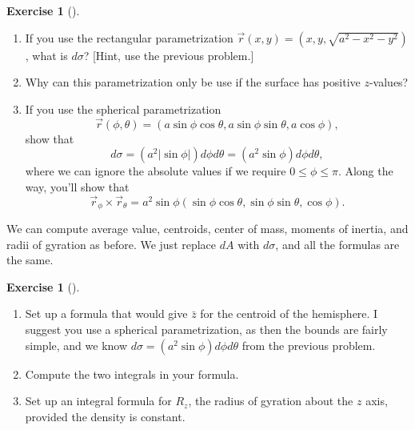 \documentclass[10pt,]{book}
\theoremstyle{plain}
\theoremstyle{definition}
\theoremstyle{definition}
\theoremstyle{definition}
\theoremstyle{definition}
\newtheorem{exploration}[project]{Exercise}
\theoremstyle{definition}
\numberwithin{equation}{section}
\begin{document}
\begin{exploration}[]\label{sphere_surface_area_element}
\leavevmode%
\begin{enumerate}[font=\bfseries,label=(\alph*),ref=\alph*]
\item\label{task-760} If you use the rectangular parametrization \(\vec r(x,y) = (x,y,\sqrt{a^2-x^2-y^2})\), what is \(d\sigma\)? [Hint, use the previous problem.]%
\item\label{task-761} Why can this parametrization only be use if the surface has positive \(z\)-values?%
\item\label{task-762} If you use the spherical parametrization%
\begin{equation*}
\vec r(\phi,\theta) = (a\sin\phi\cos\theta,a\sin\phi\sin\theta,a\cos\phi),
\end{equation*}
show that%
\begin{equation*}
d\sigma = (a^2|\sin\phi|)d\phi d\theta= (a^2\sin\phi) d\phi d\theta,
\end{equation*}
where we can ignore the absolute values if we require \(0\leq \phi\leq \pi\). Along the way, you'll show that%
\begin{equation*}
\vec r_\phi\times \vec r_\theta = a^2\sin \phi (\sin\phi\cos\theta,\sin\phi\sin\theta,\cos\phi).
\end{equation*}
%
\end{enumerate}
\end{exploration}
We can compute average value, centroids, center of mass, moments of inertia, and radii of gyration as before. We just replace \(dA\) with \(d\sigma\), and all the formulas are the same.%
\begin{exploration}[]\label{exploration-282}
\leavevmode%
\begin{enumerate}[font=\bfseries,label=(\alph*),ref=\alph*]
\item\label{task-763} Set up a formula that would give \(\bar z\) for the centroid of the hemisphere. I suggest you use a spherical parametrization, as then the bounds are fairly simple, and we know \(d\sigma = (a^2\sin\phi) d\phi d\theta\) from the previous problem.%
\item\label{task-764} Compute the two integrals in your formula.%
\item\label{task-765} Set up an integral formula for \(R_z\), the radius of gyration about the \(z\) axis, provided the density is constant.%
\end{enumerate}
\end{exploration}
\typeout{************************************************}
\typeout{************************************************}
\end{document}
